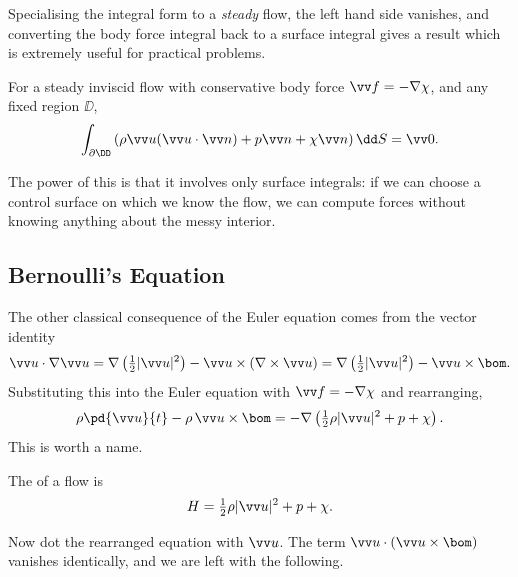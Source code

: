 Specialising the integral form to a \emph{steady} flow, the left hand side vanishes, and converting the body force integral back to a surface integral gives a result which is extremely useful for practical problems.

\begin{proposition}
	For a steady inviscid flow with conservative body force $\vv f = -\nabla \chi$, and any fixed region $\DD$,
	$$
	\int_{\partial \DD}\left(\rho \vv u (\vv u \cdot \vv n) + p \vv n + \chi \vv n\right) \dd S = \vv 0.
	$$
\end{proposition}

The power of this is that it involves only surface integrals: if we can choose a control surface on which we know the flow, we can compute forces without knowing anything about the messy interior.

\subsection{Bernoulli's Equation}

The other classical consequence of the Euler equation comes from the vector identity
$$
\vv u \cdot \nabla \vv u = \nabla \left(\tfrac{1}{2}|\vv u|^2\right) - \vv u \times (\nabla \times \vv u) = \nabla \left(\tfrac{1}{2}|\vv u|^2\right) - \vv u \times \bom.
$$
Substituting this into the Euler equation with $\vv f = -\nabla \chi$ and rearranging,
$$
\rho \pd{\vv u}{t} - \rho \, \vv u \times \bom = -\nabla\left(\tfrac{1}{2}\rho|\vv u|^2 + p + \chi \right).
$$
This is worth a name.

\begin{definition}
	The  of a flow is
	$$
	H = \tfrac{1}{2}\rho |\vv u|^2 + p + \chi.
	$$
\end{definition}

Now dot the rearranged equation with $\vv u$. The term $\vv u \cdot (\vv u \times \bom)$ vanishes identically, and we are left with the following.


